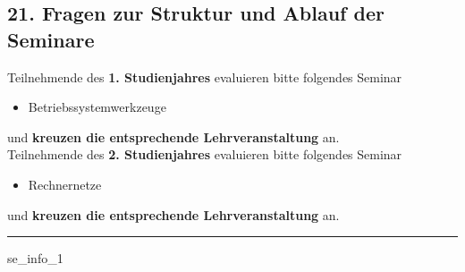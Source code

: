 \documentclass[a4paper,10pt]{article}
\begin{document}
{\vspace{-1cm}


\pagebreak



\subsection*{21. Fragen zur Struktur und Ablauf der Seminare}

Teilnehmende des \textbf{1. Studienjahres} evaluieren bitte folgendes Seminar
\begin{itemize}
	\item Betriebssystemwerkzeuge
\end{itemize}
und \textbf{kreuzen die entsprechende Lehrveranstaltung} an. \\

Teilnehmende des \textbf{2. Studienjahres} evaluieren bitte folgendes Seminar
\begin{itemize}
	\item Rechnernetze
\end{itemize}
und \textbf{kreuzen die entsprechende Lehrveranstaltung} an.

\vspace{.5cm}
\noindent\rule{\textwidth}{1pt}
\vspace{0.5cm}

\begin{questionmult}{se_info_1}
	\begin{choices}
	\end{choices}
\end{questionmult}


 \\

\begin{enumerate}


\end{enumerate}}
\end{document}
